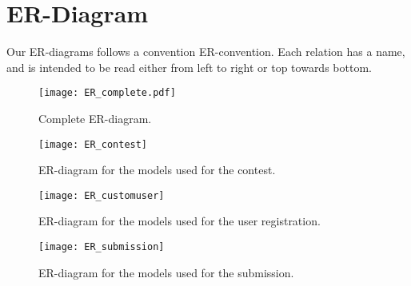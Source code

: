 \chapter{ER-Diagram}\label{appendix:ER}
Our ER-diagrams follows a convention ER-convention. Each relation has a name,
and is intended to be read either from left to right or top towards bottom.

\begin{figure}[h!]
\texttt{[image: ER\_complete.pdf]}
    \centering
	\caption{Complete ER-diagram.}
	\label{fig:ERComplete}
\end{figure}

\begin{figure}[h!]
	\texttt{[image: ER\_contest]}
    \caption{ER-diagram for the models used for the contest.}
	\label{fig:ERContest}
\end{figure}

\begin{figure}[h!]
	\texttt{[image: ER\_customuser]}
    \caption{ER-diagram for the models used for the user registration.}
	\label{fig:ERCustomuser}
\end{figure}

\begin{figure}[h!]
	\texttt{[image: ER\_submission]}
    \caption{ER-diagram for the models used for the submission.}
	\label{fig:ERSubmission}
\end{figure}
